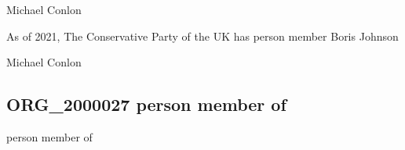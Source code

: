\documentclass[letterpaper,10pt,english]{sphinxmanual}
\begin{document}
\begin{sphinxShadowBox}

\sphinxAtStartPar
Michael Conlon 
\end{sphinxShadowBox}

\begin{sphinxShadowBox}

\sphinxAtStartPar
{\hyperref[\detokenize{doc-ORG_0000001::doc}]{}}
\end{sphinxShadowBox}

\begin{sphinxShadowBox}

\sphinxAtStartPar
{\hyperref[\detokenize{doc-NCBITaxon_9606::doc}]{}}
\end{sphinxShadowBox}

\begin{sphinxShadowBox}

\sphinxAtStartPar
{\hyperref[\detokenize{doc-ORG_2000027::doc}]{}}
\end{sphinxShadowBox}

\begin{sphinxShadowBox}

\sphinxAtStartPar
As of 2021, The Conservative Party of the UK has person member Boris Johnson
\end{sphinxShadowBox}

\begin{sphinxShadowBox}

\sphinxAtStartPar
Michael Conlon 
\end{sphinxShadowBox}
\begin{quote}

\ignorespaces \end{quote}


\subsection{ORG\_2000027 \sphinxhyphen{} person member of}
\label{\detokenize{doc-ORG_2000027:org-2000027-person-member-of}}\label{\detokenize{doc-ORG_2000027:index-0}}\label{\detokenize{doc-ORG_2000027::doc}}
\begin{sphinxShadowBox}

\sphinxAtStartPar
person member of
\end{sphinxShadowBox}
\end{document}
